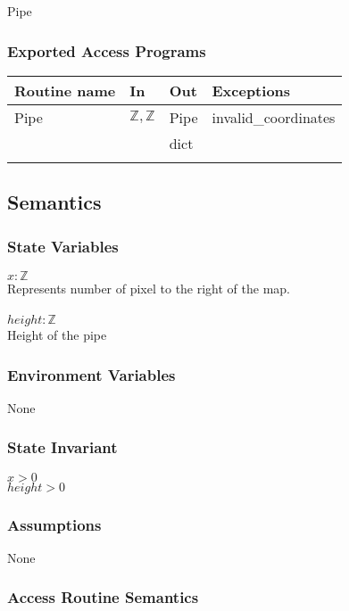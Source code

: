 \documentclass[12pt]{article}
\begin{document}
Pipe

\subsubsection* {Exported Access Programs}

\begin{tabular}{| l | l | l | l |}
\hline
\textbf{Routine name} & \textbf{In} & \textbf{Out} & \textbf{Exceptions}\\
\hline
Pipe &$\mathbb{Z}, \mathbb{Z}$ & Pipe & invalid\_coordinates\\
\hline
\textcolor{red}{serialize & & dict & \\}
\hline


\end{tabular}

\subsection* {Semantics}

\subsubsection* {State Variables}

$x: \mathbb{Z}$\\
Represents number of pixel to the right of the map.\\ 
\\
$height: \mathbb{Z}$\\
Height of the pipe\\

\subsubsection* {Environment Variables}

None

\subsubsection* {State Invariant}
$x > 0$\\
$height > 0$\\ 
\subsubsection* {Assumptions}
None
\subsubsection* {Access Routine Semantics}
\end{document}
